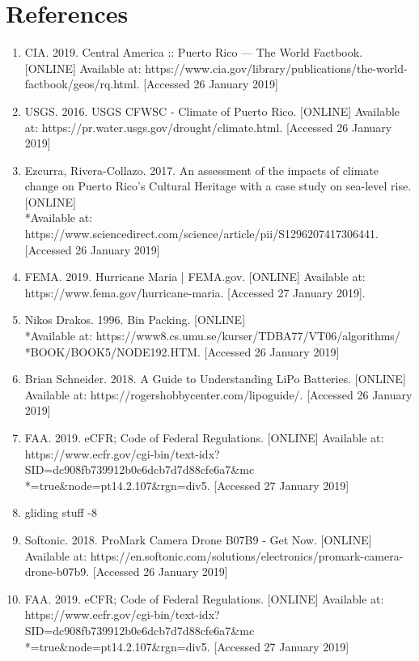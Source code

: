 \documentclass[a4paper,12pt]{article}
\begin{document}
\newpage

\section{References}

\begin{enumerate}
\item CIA. 2019. Central America :: Puerto Rico — The World Factbook. [ONLINE] Available at: https://www.cia.gov/library/publications/the-world-factbook/geos/rq.html. [Accessed 26 January 2019]
\item USGS. 2016. USGS CFWSC - Climate of Puerto Rico. [ONLINE] Available at: https://pr.water.usgs.gov/drought/climate.html. [Accessed 26 January 2019]
\item Ezcurra, Rivera-Collazo. 2017. An assessment of the impacts of climate change on Puerto Rico's Cultural Heritage with a case study on sea-level rise. [ONLINE] \\*Available at: https://www.sciencedirect.com/science/article/pii/S1296207417306441. [Accessed 26 January 2019]
\item FEMA. 2019. Hurricane Maria | FEMA.gov. [ONLINE] Available at: https://www.fema.gov/hurricane-maria. [Accessed 27 January 2019].
\item Nikos Drakos. 1996. Bin Packing. [ONLINE] \\*Available at: https://www8.cs.umu.se/kurser/TDBA77/VT06/algorithms/\\*BOOK/BOOK5/NODE192.HTM. [Accessed 26 January 2019]
\item Brian Schneider. 2018. A Guide to Understanding LiPo Batteries. [ONLINE] Available at: https://rogershobbycenter.com/lipoguide/. [Accessed 26 January 2019]
\item FAA. 2019. eCFR; Code of Federal Regulations. [ONLINE] Available at: https://www.ecfr.gov/cgi-bin/text-idx?SID=dc908fb739912b0e6dcb7d7d88cfe6a7\&mc\\*=true\&node=pt14.2.107\&rgn=div5. [Accessed 27 January 2019]
\item gliding stuff -8
\item Softonic. 2018. ProMark Camera Drone B07B9 - Get Now. [ONLINE] Available at: https://en.softonic.com/solutions/electronics/promark-camera-drone-b07b9. [Accessed 26 January 2019]
\item FAA. 2019. eCFR; Code of Federal Regulations. [ONLINE] Available at: https://www.ecfr.gov/cgi-bin/text-idx?SID=dc908fb739912b0e6dcb7d7d88cfe6a7\&mc\\*=true\&node=pt14.2.107\&rgn=div5. [Accessed 27 January 2019]
\end{enumerate}
\end{document}
